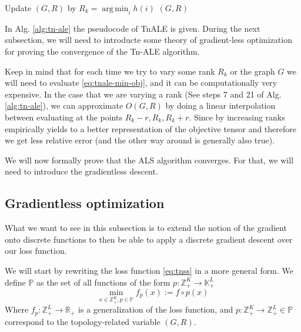 \documentclass[11pt,a4paper,openright,oneside]{book}
\numberwithin{equation}{section}
\DeclareMathOperator*{\argmin}{arg\,min}
\begin{document}
{\begin{algorithm}[h]
\begin{algorithmic}[1]
                \EndFor
                \State Update $(G, R)$ by $R_k = \argmin_i h(i)$
            \EndFor
        \EndFor
        \State \Return $(G, R)$

    \end{algorithmic}

    \label{alg:tn-ale}
\end{algorithm}

In Alg. \ref{alg:tn-ale} the pseudocode of TnALE is given. During the next subsection, we will need to introducte some theory of
gradient-less optimization for proving the convergence of the Tn-ALE algorithm.

Keep in mind that for each time we try to vary some rank $R_k$ or the graph $G$ we will need to evaluate \eqref{eq:tnale-min-obj}, and it 
can be computationally very expensive. In the case that we are varying a rank (See steps 7 and 21 of Alg. \ref{alg:tn-ale}), we can 
approximate $O(G, R)$ by doing a linear interpolation between evaluating at the points
$R_k - r, R_k, R_k + r$. Since by increasing ranks empirically yields 
to a better representation of the objective tensor \cite{liAlternatingLocalEnumeration2023} and therefore we get less relative error
(and the other way around is generally also true).

We will now formally prove that the ALS algorithm converges. For that, we will need to introduce the gradientless descent.

\subsection{Gradientless optimization}

What we want to see in this subsection is to extend the notion of the gradient onto 
discrete functions to then be able to apply a discrete gradient descent over our loss function.

We will start by rewriting the loss function \eqref{eq:tnss} in a more general form. We define $\mathbb{P}$ as the
set of all functions of the form $p : \mathbb{Z}_+^K \rightarrow \mathbb{K}_+^L$
\begin{equation}
\min_{x \in \mathbb{Z}_+^K, p \in \mathbb{P}} f_p(x) := f \circ p(x)
\label{eq:min_grad}
\end{equation}
Where $f_p : \mathbb{Z}_+^L \rightarrow \mathbb{R}_+$ is a generalization of the loss function, and $p : \mathbb{Z}_+^K \rightarrow \mathbb{Z}_+^L \in \mathbb{P}$
correspond to the topology-related variable $(G, R)$.

}
\end{document}
